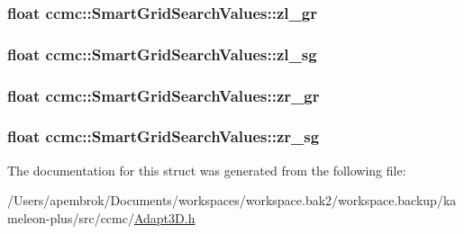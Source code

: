 \hypertarget{structccmc_1_1_smart_grid_search_values_a48282880363f71c4808e1c52b02b3f15}{
\subsubsection[{zl\-\_\-gr}]{\setlength{\rightskip}{0pt plus 5cm}float ccmc\-::\-Smart\-Grid\-Search\-Values\-::zl\-\_\-gr}}\label{structccmc_1_1_smart_grid_search_values_a48282880363f71c4808e1c52b02b3f15}
\hypertarget{structccmc_1_1_smart_grid_search_values_a5fb89265acfd6f65e95d71ae9ddc8a96}{
\subsubsection[{zl\-\_\-sg}]{\setlength{\rightskip}{0pt plus 5cm}float ccmc\-::\-Smart\-Grid\-Search\-Values\-::zl\-\_\-sg}}\label{structccmc_1_1_smart_grid_search_values_a5fb89265acfd6f65e95d71ae9ddc8a96}
\hypertarget{structccmc_1_1_smart_grid_search_values_a8b574711e03c10b054ce85b65123349b}{
\subsubsection[{zr\-\_\-gr}]{\setlength{\rightskip}{0pt plus 5cm}float ccmc\-::\-Smart\-Grid\-Search\-Values\-::zr\-\_\-gr}}\label{structccmc_1_1_smart_grid_search_values_a8b574711e03c10b054ce85b65123349b}
\hypertarget{structccmc_1_1_smart_grid_search_values_aafc8fc1c1fbadae14f2a921f14853189}{
\subsubsection[{zr\-\_\-sg}]{\setlength{\rightskip}{0pt plus 5cm}float ccmc\-::\-Smart\-Grid\-Search\-Values\-::zr\-\_\-sg}}\label{structccmc_1_1_smart_grid_search_values_aafc8fc1c1fbadae14f2a921f14853189}


The documentation for this struct was generated from the following file\-:\begin{DoxyCompactItemize}
\item 
/\-Users/apembrok/\-Documents/workspaces/workspace.\-bak2/workspace.\-backup/kameleon-\/plus/src/ccmc/\hyperlink{_adapt3_d_8h}{Adapt3\-D.\-h}\end{DoxyCompactItemize}
